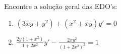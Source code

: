 \begin{frame}
\begin{casa}
 Encontre a solução geral das EDO's:
\begin{enumerate}

\item $(3xy+y^2)+(x^2+xy)y'=0$

\item $\frac{2y(1+x^2)}{1+2x^2}y'-\frac{2xy^2}{(1+2x^2)^2}=1$
\end{enumerate}
\end{casa}
\end{frame}
%
%
%
%
%
%
%
%
%
%
